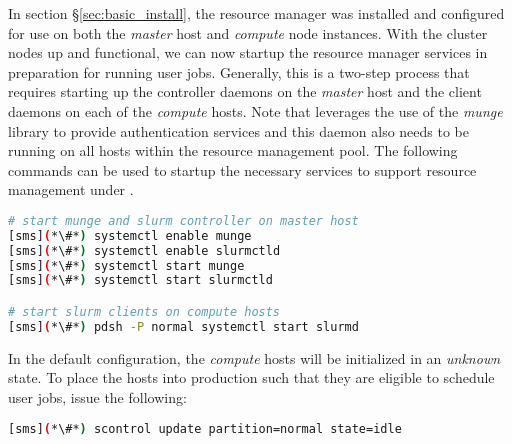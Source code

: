 In section \S\ref{sec:basic_install}, the \SLURM{} resource manager was installed
and configured for use on both the {\em master} host and {\em compute} node
instances. With the cluster nodes up and functional, we can now startup the
resource manager services in preparation for running user jobs. Generally, this
is a two-step process that requires starting up the controller daemons on the {\em
 master} host and the client daemons on each of the {\em compute} hosts.
Note that \SLURM{} leverages the use of the {\em munge} library to provide
authentication services and this daemon also needs to be running on all hosts
within the resource management pool. 
The following commands can be used to startup the necessary services to support
resource management under \SLURM{}.


\begin{lstlisting}[language=bash,keywords={}]
# start munge and slurm controller on master host
[sms](*\#*) systemctl enable munge
[sms](*\#*) systemctl enable slurmctld
[sms](*\#*) systemctl start munge
[sms](*\#*) systemctl start slurmctld

# start slurm clients on compute hosts
[sms](*\#*) pdsh -P normal systemctl start slurmd
\end{lstlisting}

In the default configuration, the {\em compute} hosts will be initialized in an
{\em unknown} state. To place the hosts into production such that they are
eligible to schedule user jobs, issue the following:

\begin{lstlisting}[language=bash]
[sms](*\#*) scontrol update partition=normal state=idle
\end{lstlisting}

